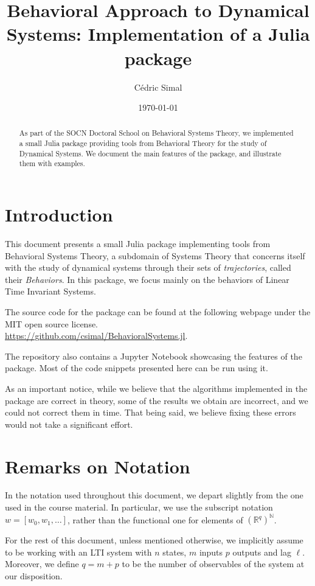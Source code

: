 \documentclass[11pt]{article}
\author{Cédric Simal}
\date{\today}
\title{Behavioral Approach to Dynamical Systems: Implementation of a Julia package}
\def\N{\mathbb{N}}
\def\R{\mathbb{R}}
\begin{document}
\maketitle

\begin{abstract}
    As part of the SOCN Doctoral School on Behavioral Systems Theory, we implemented a small Julia package providing tools from Behavioral Theory for the study of Dynamical Systems. We document the main features of the package, and illustrate them with examples.
\end{abstract}

\section*{Introduction}
This document presents a small Julia package implementing tools from Behavioral Systems Theory, a subdomain of Systems Theory that concerns itself with the study of dynamical systems through their sets of \textit{trajectories}, called their \textit{Behaviors}. In this package, we focus mainly on the behaviors of Linear Time Invariant Systems.

The source code for the package can be found at the following webpage under the MIT open source license.\\
\url{https://github.com/csimal/BehavioralSystems.jl}.

The repository also contains a Jupyter Notebook showcasing the features of the package. Most of the code snippets presented here can be run using it.

As an important notice, while we believe that the algorithms implemented in the package are correct in theory, some of the results we obtain are incorrect, and we could not correct them in time. That being said, we believe fixing these errors would not take a significant effort.

\section*{Remarks on Notation}
In the notation used throughout this document, we depart slightly from the one used in the course material. In particular, we use the subscript notation $w = [w_0, w_1, \dots]$, rather than the functional one for elements of $(\R^q)^\N$.

For the rest of this document, unless mentioned otherwise, we implicitly assume to be working with an LTI system with $n$ states, $m$ inputs $p$ outputs and lag $\ell$. Moreover, we define $q=m+p$ to be the number of observables of the system at our disposition.
\end{document}
